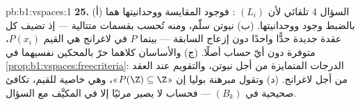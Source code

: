 \begin{solution}{pb:b1:vspaces:1}
\textbf{25.} (أ) السؤال 4 تلقائي لأن $(L_i)$
\emph{}: فوجود المقايسة ووحدانيتها هما
بالضبط وجود  ووحدانيتها. (ب)  نيوتن
سلّم، ومنه تُحسب  بقسمات متتالية ---
إذ تضيف كل عقدة جديدة حدًّا واحدًا دون إزعاج
السابقة --- بينما  $P$ في  لاغرانج هي
القيم $P(x_i)$، متوفرة دون أيّ حساب أصلًا. (ج) والأساسان
كلاهما حرّ بالمحكين نفسيهما في
\cref{prop:b1:vspaces:freecriteria}: الدرجات المتمايزة من أجل نيوتن،
والتقويم عند العقد من أجل لاغرانج. (د) وتقول مبرهنة بوليا
إن «$P(\Z) \subseteq \Z$»، وهي خاصية للقيم، تكافئ
صحيحية  في  $(B_k)$ --- فحساب
 لا يصير مرئيًا إلا في 
المكيَّف مع السؤال.
\end{solution}
